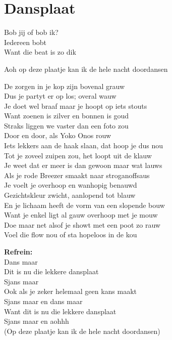 \section{Dansplaat} 
Bob jij of bob ik?\\
Iedereen bobt\\
Want die beat is zo dik

Aoh op deze plaatje kan ik de hele nacht doordansen

De zorgen in je kop zijn bovenal grauw\\
Dus je partyt er op los; overal wauw\\
Je doet wel braaf maar je hoopt op iets stouts\\
Want zoenen is zilver en bonnen is goud\\
Straks liggen we vaster dan een foto zou\\
Door en door, als Yoko Onos rouw\\
Iets lekkers aan de haak slaan, dat hoop je dus nou\\
Tot je zoveel zuipen zou, het loopt uit de klauw\\
Je weet dat er meer is dan gewoon maar wat lauws\\
Als je rode Breezer smaakt naar stroganoffsaus\\
Je voelt je overhoop en wanhopig benauwd\\
Gezichtskleur zwicht, aanlopend tot blauw\\
En je lichaam heeft de vorm van een slopende bouw\\
Want je enkel ligt al gauw overhoop met je mouw\\
Doe maar net alsof je showt met een poot zo rauw\\
Voel die flow nou of sta hopeloos in de kou

\textbf{Refrein:}\\
Dans maar\\
Dit is nu die lekkere dansplaat\\
Sjans maar\\
Ook als je zeker helemaal geen kans maakt\\
Sjans maar en dans maar\\
Want dit is nu die lekkere dansplaat\\
Sjans maar en aohhh\\
(Op deze plaatje kan ik de hele nacht doordansen)


